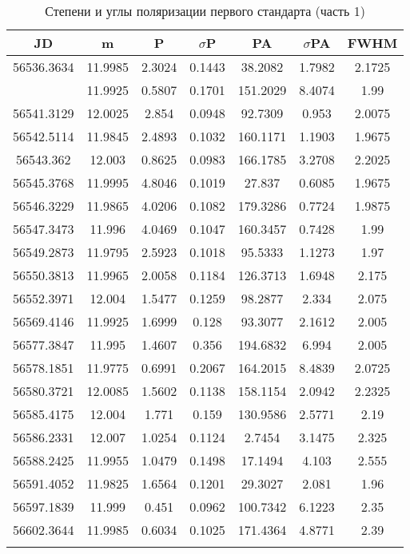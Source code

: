 \newpage

\begin{table}[h]
  \centering
  \caption{Степени и углы поляризации первого стандарта (часть 1)}
  \begin{tabular}{ccccccc}
    \toprule
    JD &
    m &
    P &
    $\sigma$P &
    PA &
    $\sigma$PA &
    FWHM \\
    \midrule
    56536.3634 & 11.9985 & 2.3024 & 0.1443 & 38.2082 & 1.7982 & 2.1725 \\
    \arrayrulecolor{black!40}
    \midrule
    56540.4348 & 11.9925 & 0.5807 & 0.1701 & 151.2029 & 8.4074 & 1.99 \\
    \midrule
    56541.3129 & 12.0025 & 2.854 & 0.0948 & 92.7309 & 0.953 & 2.0075 \\
    \midrule
    56542.5114 & 11.9845 & 2.4893 & 0.1032 & 160.1171 & 1.1903 & 1.9675 \\
    \midrule
    56543.362 & 12.003 & 0.8625 & 0.0983 & 166.1785 & 3.2708 & 2.2025 \\
    \midrule
    56545.3768 & 11.9995 & 4.8046 & 0.1019 & 27.837 & 0.6085 & 1.9675 \\
    \midrule
    56546.3229 & 11.9865 & 4.0206 & 0.1082 & 179.3286 & 0.7724 & 1.9875 \\
    \midrule
    56547.3473 & 11.996 & 4.0469 & 0.1047 & 160.3457 & 0.7428 & 1.99 \\
    \midrule
    56549.2873 & 11.9795 & 2.5923 & 0.1018 & 95.5333 & 1.1273 & 1.97 \\
    \midrule
    56550.3813 & 11.9965 & 2.0058 & 0.1184 & 126.3713 & 1.6948 & 2.175 \\
    \midrule
    56552.3971 & 12.004 & 1.5477 & 0.1259 & 98.2877 & 2.334 & 2.075 \\
    \midrule
    56569.4146 & 11.9925 & 1.6999 & 0.128 & 93.3077 & 2.1612 & 2.005 \\
    \midrule
    56577.3847 & 11.995 & 1.4607 & 0.356 & 194.6832 & 6.994 & 2.005 \\
    \midrule
    56578.1851 & 11.9775 & 0.6991 & 0.2067 & 164.2015 & 8.4839 & 2.0725 \\
    \midrule
    56580.3721 & 12.0085 & 1.5602 & 0.1138 & 158.1154 & 2.0942 & 2.2325 \\
    \midrule
    56585.4175 & 12.004 & 1.771 & 0.159 & 130.9586 & 2.5771 & 2.19 \\
    \midrule
    56586.2331 & 12.007 & 1.0254 & 0.1124 & 2.7454 & 3.1475 & 2.325 \\
    \midrule
    56588.2425 & 11.9955 & 1.0479 & 0.1498 & 17.1494 & 4.103 & 2.555 \\
    \midrule
    56591.4052 & 11.9825 & 1.6564 & 0.1201 & 29.3027 & 2.081 & 1.96 \\
    \midrule
    56597.1839 & 11.999 & 0.451 & 0.0962 & 100.7342 & 6.1223 & 2.35 \\
    \midrule
    56602.3644 & 11.9985 & 0.6034 & 0.1025 & 171.4364 & 4.8771 & 2.39 \\
    \arrayrulecolor{black}
    \bottomrule
  \end{tabular}
\end{table}

